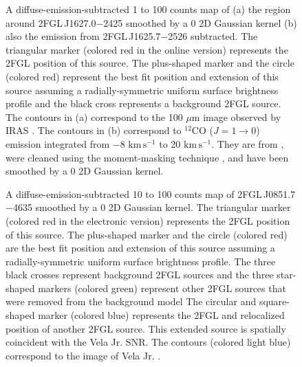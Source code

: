 \documentclass[12pt,preprint]{aastex}
\newif\ifcolorfigure
\newcommand{\gev}{\text{GeV}\xspace}
\newcommand{\tev}{\text{TeV}\xspace}
\newcommand{\s}{\text{s}\xspace}
\newcommand{\km}{\text{km}\xspace}
\begin{document}
\begin{figure}
    \ifcolorfigure
      \plotone{source_plots/source_Ophiuchus_color.eps}
    \else
    \fi
  \caption{
  A diffuse-emission-subtracted 1 \gev to 100 \gev counts map of (a) the region
  around 2FGL\,J1627.0$-$2425 smoothed by a 0 2D Gaussian kernel (b)
  also the emission from 2FGL\,J1625.7$-$2526
  subtracted.  The triangular marker 
  (colored red in the
  online version) represents the 2FGL position of this source.
  The plus-shaped marker and the circle (colored red) 
  represent the best fit position and extension of this
  source assuming a radially-symmetric uniform surface brightness profile
  and the black cross represents a background 2FGL source. 
  The
  contours in (a) correspond to the 100 $\mu$m image observed by
  IRAS \citep{iras_rho_ophiuci}.  The contours in (b) correspond to
  ${}^{12}\text{CO}$ ($J=1\rightarrow 0$) emission integrated from $-$8 $\km\,\s^{-1}$
  to 20 $\km\,\s^{-1}$.  They are from \cite{co_rho_ophiuci}, were cleaned using
  the moment-masking technique \citep{masking_moment_2011}, and have
  been smoothed by a 0 2D Gaussian kernel.
  }\label{1FGL_J1628.6-2419c}
\end{figure}



\begin{figure}
    \ifcolorfigure
      \plotone{source_plots/source_Vela_Jr_color.eps}
    \else
    \fi
  \caption{A diffuse-emission-subtracted 10 \gev to 100 \gev counts map of
  2FGL\,J0851.7$-$4635 smoothed by a 0 2D Gaussian
  kernel. The triangular marker (colored red in the electronic version)
  represents the 2FGL position of this source.  The plus-shaped marker
  and the circle (colored red) are the best fit position and extension of
  this source assuming a radially-symmetric uniform surface brightness profile.
  The three black crosses represent background 2FGL sources
  and the three star-shaped markers (colored green) represent other 2FGL sources
  that were removed from the background model 
  The circular and square-shaped
  marker (colored blue) represents the 2FGL and relocalized position of another 2FGL source.  
  This extended source is spatially
  coincident with the Vela Jr. SNR.  The contours (colored light blue)
  correspond to the \tev image of Vela Jr.
  \citep{vela_jr_hess}.
  }\label{Vela_Jr}
\end{figure}
\end{document}
